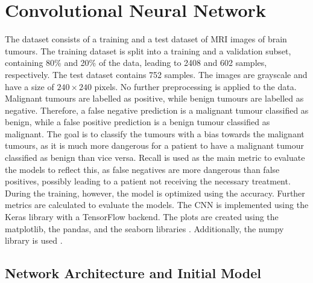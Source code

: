 \chapter{Convolutional Neural Network}
\label{cha:CNN}

The dataset consists of a training and a test dataset of MRI images of brain tumours. 
The training dataset is split into a training and a validation subset, containing 80\% and 20\% of the data, leading to 2408 and 602 samples, respectively.
The test dataset contains 752 samples.
The images are grayscale and have a size of $240 \times 240$ pixels.
No further preprocessing is applied to the data.
Malignant tumours are labelled as positive, while benign tumours are labelled as negative.
Therefore, a false negative prediction is a malignant tumour classified as benign, while a false positive prediction is a benign tumour classified as malignant.
The goal is to classify the tumours with a bias towards the malignant tumours, as it is much more dangerous for a patient to have a malignant tumour classified as benign than vice versa.
Recall is used as the main metric to evaluate the models to reflect this, as false negatives are more dangerous than false positives, possibly leading to a patient not receiving the necessary treatment.
During the training, however, the model is optimized using the accuracy.
Further metrics are calculated to evaluate the models. \newline
The CNN is implemented using the Keras \cite{keras} library with a TensorFlow \cite{tensorflow} backend.
The plots are created using the matplotlib, the pandas, and the seaborn libraries \cite{matplotlib, pandas, seaborn}.
Additionally, the numpy library is used \cite{numpy}.

\section{Network Architecture and Initial Model}
\label{sec:initialModel}

